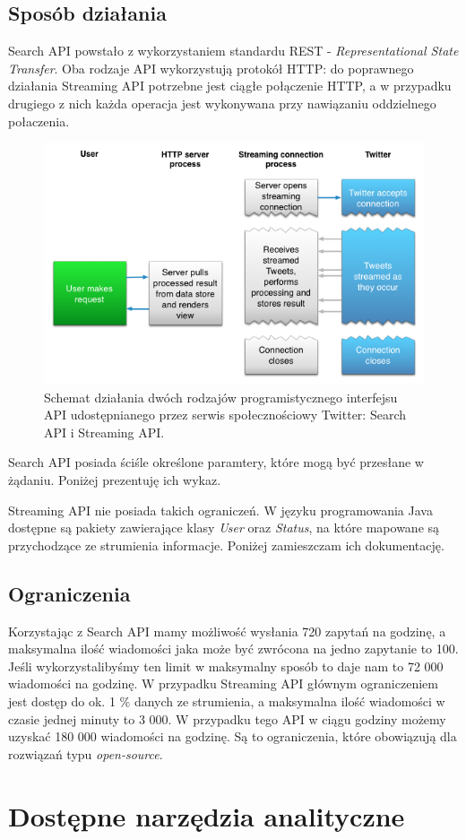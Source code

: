 \subsection{Sposób działania}
Search API powstało z wykorzystaniem standardu REST - \textit{Representational State Transfer}. Oba rodzaje API wykorzystują protokół HTTP: do poprawnego działania Streaming API potrzebne jest ciągłe połączenie HTTP, a w przypadku drugiego z nich każda operacja jest wykonywana przy nawiązaniu oddzielnego połaczenia.

\begin{figure}[h] %
	\centering
	\includegraphics[width=0.6\linewidth]{img/twitter_api_comparison}
	\caption{Schemat działania dwóch rodzajów programistycznego interfejsu API udostępnianego przez serwis społecznościowy Twitter: Search API i Streaming API.}
\end{figure}

Search API posiada ściśle określone paramtery, które mogą być przesłane w żądaniu. Poniżej prezentuję ich wykaz.



Streaming API nie posiada takich ograniczeń. W języku programowania Java dostępne są pakiety zawierające klasy \textit{User} oraz \textit{Status}, na które mapowane są przychodzące ze strumienia informacje. Poniżej zamieszczam ich dokumentację.



\subsection{Ograniczenia}
Korzystając z Search API mamy możliwość wysłania 720 zapytań na godzinę, a maksymalna ilość wiadomości jaka może być zwrócona na jedno zapytanie to 100. Jeśli wykorzystalibyśmy ten limit w maksymalny sposób to daje nam to 72 000 wiadomości na godzinę. W przypadku Streaming API głównym ograniczeniem jest dostęp do ok. 1 \% danych ze strumienia, a maksymalna ilość wiadomości w czasie jednej minuty to 3 000. W przypadku tego API w ciągu godziny możemy uzyskać 180 000 wiadomości na godzinę. Są to ograniczenia, które obowiązują dla rozwiązań typu \textit{open-source}.

\section{Dostępne narzędzia analityczne}